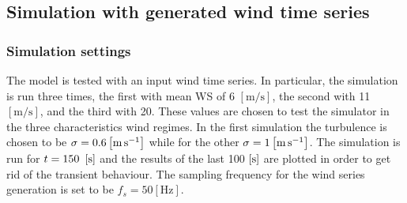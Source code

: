 \subsection{Simulation with generated wind time series}\label{sec:wind_series_sim}
\subsubsection{Simulation settings}
The model is tested with an input wind time series. In particular, the simulation is run three times, the first with mean \acrshort{WS} of 6 $\left[\si{\meter\per\second}\right]$, the second with  11 $\left[\si{\meter\per\second}\right]$, and the third with 20. These values are chosen to test the simulator in the three characteristics wind regimes. In the first simulation the turbulence is chosen to be $\sigma=0.6 \left[\si{\meter\per\second}\right]$ while for the other $\sigma=1 \left[\si{\meter\per\second}\right]$. The simulation is run for $t=150\ \mesunt{\second}$ and the results of the last 100 $\left[\si{\second}\right]$ are plotted in order to get rid of the transient behaviour. The sampling frequency for the wind series generation is set to be $f_s=50 \left[\si{\hertz}\right]$.

